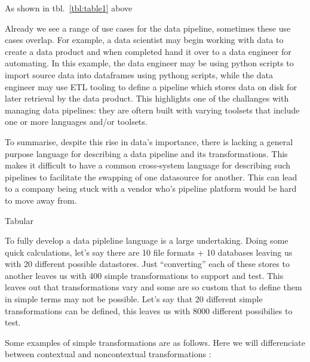As shown in tbl.~\ref{tbl:table1} above

Already we see a range of use cases for the data pipeline, sometimes
these use cases overlap. For example, a data scientist may begin working
with data to create a data product and when completed hand it over to a
data engineer for automating. In this example, the data engineer may be
using python scripts to import source data into dataframes using pythong
scripts, while the data engineer may use ETL tooling to define a
pipeline which stores data on disk for later retrieval by the data
product. This highlights one of the challanges with managing data
pipelines: they are oftern built with varying toolsets that include one
or more languages and/or toolsets.

To summarise, despite this rise in data's importance, there is lacking a
general purpose language for describing a data pipeline and its
transformations. This makes it difficult to have a common cross-system
language for describing such pipelines to facilitate the swapping of one
datasource for another. This can lead to a company being stuck with a
vendor who's pipeline platform would be hard to move away from.

Tabular

To fully develop a data pipleline language is a large undertaking. Doing
some quick calculations, let's say there are 10 file formats + 10
databases leaving us with 20 different possible datastores. Just
``converting'' each of these stores to another leaves us with 400 simple
transformations to support and test. This leaves out that
transformations vary and some are so custom that to define them in
simple terms may not be possible. Let's say that 20 different simple
transformations can be defined, this leaves us with 8000 different
possibilies to test.

Some examples of simple transformations are as follows. Here we will
differenciate between contextual and noncontextual transformations
\citep[p.~106]{pipelines_pocket}:

